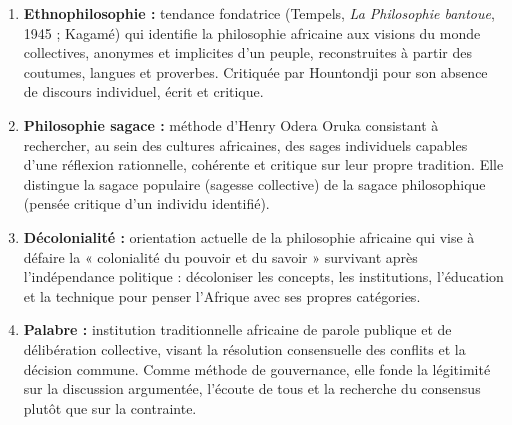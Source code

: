 \documentclass[11pt]{article}
\newcommand{\cle}[1]{{\popxbold\color{popdark}#1}}
\begin{document}
\begin{corrige}
\begin{enumerate}
    \item \textbf{\cle{Ethnophilosophie} :} tendance fondatrice (Tempels, \emph{La Philosophie bantoue}, 1945 ; Kagamé) qui identifie la philosophie africaine aux visions du monde collectives, anonymes et implicites d'un peuple, reconstruites à partir des coutumes, langues et proverbes. Critiquée par Hountondji pour son absence de discours individuel, écrit et critique.
    \item \textbf{\cle{Philosophie sagace} :} méthode d'Henry Odera Oruka consistant à rechercher, au sein des cultures africaines, des sages individuels capables d'une réflexion rationnelle, cohérente et critique sur leur propre tradition. Elle distingue la sagace populaire (sagesse collective) de la sagace philosophique (pensée critique d'un individu identifié).
    \item \textbf{\cle{Décolonialité} :} orientation actuelle de la philosophie africaine qui vise à défaire la « colonialité du pouvoir et du savoir » survivant après l'indépendance politique : décoloniser les concepts, les institutions, l'éducation et la technique pour penser l'Afrique avec ses propres catégories.
    \item \textbf{\cle{Palabre} :} institution traditionnelle africaine de parole publique et de délibération collective, visant la résolution consensuelle des conflits et la décision commune. Comme méthode de gouvernance, elle fonde la légitimité sur la discussion argumentée, l'écoute de tous et la recherche du consensus plutôt que sur la contrainte.
\end{enumerate}
\end{corrige}
\end{document}
